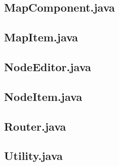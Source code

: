 \subsection{MapComponent.java}
\begin{lgrind}

\end{lgrind}

\subsection{MapItem.java}
\begin{lgrind}

\end{lgrind}

\subsection{NodeEditor.java}
\begin{lgrind}

\end{lgrind}

\subsection{NodeItem.java}
\begin{lgrind}

\end{lgrind}

\subsection{Router.java}
\begin{lgrind}

\end{lgrind}

\subsection{Utility.java}
\begin{lgrind}

\end{lgrind}

